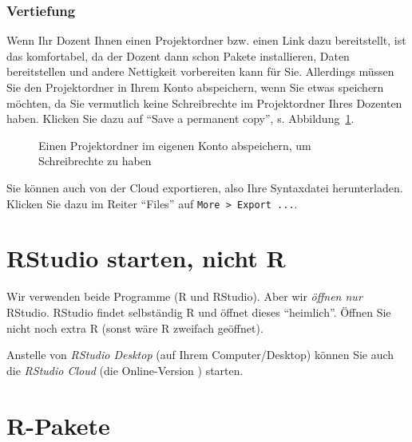 \documentclass[
  a4paper,
  DIV=11]{scrreprt}
\theoremstyle{definition}
\theoremstyle{definition}
\theoremstyle{definition}
\theoremstyle{remark}
\begin{document}
\subsubsection{Vertiefung}\label{vertiefung-1}

Wenn Ihr Dozent Ihnen einen Projektordner bzw. einen Link dazu
bereitstellt, ist das komfortabel, da der Dozent dann schon Pakete
installieren, Daten bereitstellen und andere Nettigkeit vorbereiten kann
für Sie. Allerdings müssen Sie den Projektordner in Ihrem Konto
abspeichern, wenn Sie etwas speichern möchten, da Sie vermutlich keine
Schreibrechte im Projektordner Ihres Dozenten haben. Klicken Sie dazu
auf ``Save a permanent copy'', s. Abbildung~\ref{fig-perm-copy}.

\begin{figure}


\caption{\label{fig-perm-copy}Einen Projektordner im eigenen Konto
abspeichern, um Schreibrechte zu haben}

\end{figure}%

Sie können auch von der Cloud exportieren, also Ihre Syntaxdatei
herunterladen. Klicken Sie dazu im Reiter ``Files'' auf
\texttt{More\ \textgreater{}\ Export\ ...}.

\section{RStudio starten, nicht R}\label{rstudio-starten-nicht-r}

Wir verwenden beide Programme (R und RStudio). Aber wir \emph{öffnen
nur} RStudio. RStudio findet selbständig R und öffnet dieses
``heimlich''. Öffnen Sie nicht noch extra R (sonst wäre R zweifach
geöffnet).

Anstelle von \emph{RStudio Desktop} (auf Ihrem Computer/Desktop) können
Sie auch die \emph{RStudio Cloud} (die Online-Version ) starten.

\section{R-Pakete}\label{r-pakete}
\end{document}
